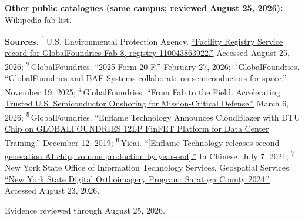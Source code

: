 \begin{minipage}[t][0.90\textheight][t]{\textwidth}
\begin{itemize}[leftmargin=1.25em,itemsep=0.35em,topsep=0.15em,parsep=0pt]
\end{itemize}
\smallskip
{\sffamily\scriptsize\color{black!62}\textbf{Other public catalogues (same campus; reviewed August 25, 2026):} \href{\detokenize{https://en.wikipedia.org/w/index.php?title=List_of_semiconductor_fabrication_plants&oldid=1370451124}\#\detokenize{Open_plants}}{Wikipedia fab list}.\par}
\medskip
{\sffamily\scriptsize\setlength{\emergencystretch}{1.5em}\textbf{Sources.} \textsuperscript{1}\,U.S. Environmental Protection Agency. \href{\detokenize{https://ofmpub.epa.gov/frs_public2/frs_rest_services.get_facilities?registry_id=110043863922&coordinates_output=yes&program_output=yes&output=JSON}}{\enquote{Facility Registry Service record for GlobalFoundries Fab 8, registry 110043863922.}} Accessed August 25, 2026; \textsuperscript{2}\,GlobalFoundries. \href{\detokenize{https://investors.gf.com/static-files/ef3116da-5334-46e0-9b6c-56d3e67b1b92}}{\enquote{2025 Form 20-F.}} February 27, 2026; \textsuperscript{3}\,GlobalFoundries. \href{\detokenize{https://gf.com/news-and-events/news/globalfoundries-and-bae-systems-collaborate-on-semiconductors-for-space/}}{\enquote{GlobalFoundries and BAE Systems collaborate on semiconductors for space.}} November 19, 2025; \textsuperscript{4}\,GlobalFoundries. \href{\detokenize{https://gf.com/news-and-events/blog/from-fab-to-the-field-accelerating-trusted-us-semiconductor-onshoring-for-mission-critical-defense/}}{\enquote{From Fab to the Field: Accelerating Trusted U.S. Semiconductor Onshoring for Mission-Critical Defense.}} March 6, 2026; \textsuperscript{5}\,GlobalFoundries. \href{\detokenize{https://investors.gf.com/news-releases/news-release-details/enflame-technology-announces-cloudblazer-dtu-chip}}{\enquote{Enflame Technology Announces CloudBlazer with DTU Chip on GLOBALFOUNDRIES 12LP FinFET Platform for Data Center Training.}} December 12, 2019; \textsuperscript{6}\,Yicai. \href{\detokenize{https://www.yicai.com/news/101103178.html}}{\enquote{[Enflame Technology releases second-generation AI chip, volume production by year-end].}} In Chinese. July 7, 2021; \textsuperscript{7}\,New York State Office of Information Technology Services, Geospatial Services. \href{\detokenize{https://data.ny.gov/Public-Safety/Statewide-Digital-Orthoimagery/amsv-rmfz}}{\enquote{New York State Digital Orthoimagery Program: Saratoga County 2024.}} Accessed August 23, 2026.\par}
\vfill
\noindent{\color{hairline}\rule{\linewidth}{0.4pt}}\par\smallskip
{\sffamily\scriptsize\color{black!58} Evidence reviewed through August 25, 2026.\par}
\end{minipage}
